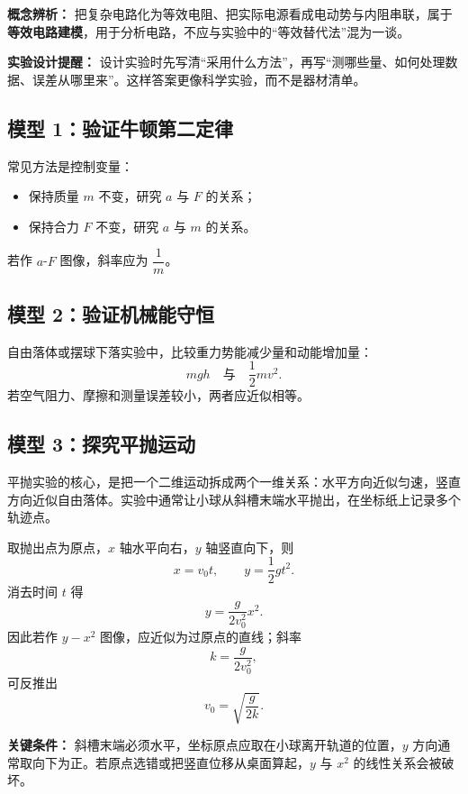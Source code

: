 \textbf{概念辨析：} 把复杂电路化为等效电阻、把实际电源看成电动势与内阻串联，属于\textbf{等效电路建模}，用于分析电路，不应与实验中的“等效替代法”混为一谈。

\textbf{实验设计提醒：} 设计实验时先写清“采用什么方法”，再写“测哪些量、如何处理数据、误差从哪里来”。这样答案更像科学实验，而不是器材清单。

\subsection*{模型 1：验证牛顿第二定律}

常见方法是控制变量：
\begin{itemize}
  \item 保持质量 $m$ 不变，研究 $a$ 与 $F$ 的关系；
  \item 保持合力 $F$ 不变，研究 $a$ 与 $m$ 的关系。
\end{itemize}
若作 $a$-$F$ 图像，斜率应为 $\dfrac1m$。

\subsection*{模型 2：验证机械能守恒}

自由落体或摆球下落实验中，比较重力势能减少量和动能增加量：
\[
mgh\quad\text{与}\quad \frac12mv^2.
\]
若空气阻力、摩擦和测量误差较小，两者应近似相等。

\subsection*{模型 3：探究平抛运动}

平抛实验的核心，是把一个二维运动拆成两个一维关系：水平方向近似匀速，竖直方向近似自由落体。实验中通常让小球从斜槽末端水平抛出，在坐标纸上记录多个轨迹点。

\begin{center}


\label{fig:projectile-experiment}
\end{center}

取抛出点为原点，$x$ 轴水平向右，$y$ 轴竖直向下，则
\[
x=v_0t,\qquad y=\frac12gt^2.
\]
消去时间 $t$ 得
\[
y=\frac{g}{2v_0^2}x^2.
\]
因此若作 $y-x^2$ 图像，应近似为过原点的直线；斜率
\[
k=\frac{g}{2v_0^2},
\]
可反推出
\[
v_0=\sqrt{\frac{g}{2k}}.
\]

\textbf{关键条件：} 斜槽末端必须水平，坐标原点应取在小球离开轨道的位置，$y$ 方向通常取向下为正。若原点选错或把竖直位移从桌面算起，$y$ 与 $x^2$ 的线性关系会被破坏。

